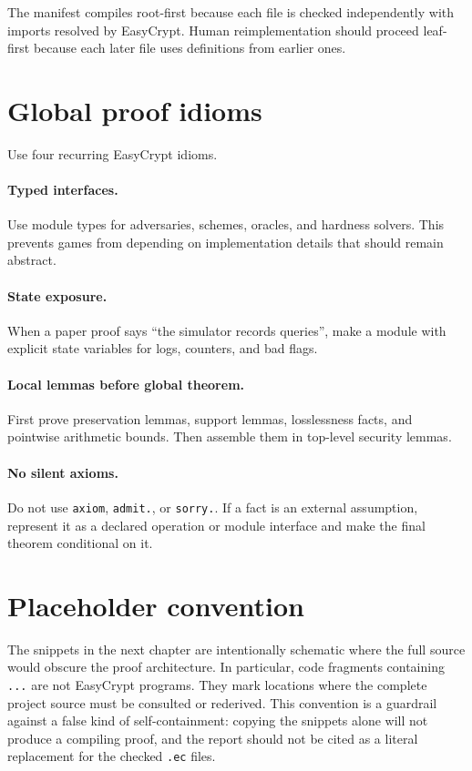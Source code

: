 \documentclass[11pt]{report}
\DeclareRobustCommand{\file}[1]{\ifmmode\text{\nolinkurl{#1}}\else\nolinkurl{#1}\fi}
\DeclareRobustCommand{\ec}[1]{\ifmmode\text{\nolinkurl{#1}}\else\nolinkurl{#1}\fi}
\theoremstyle{definition}
\theoremstyle{plain}
\begin{document}
The manifest compiles root-first because each file is checked independently
with imports resolved by EasyCrypt.  Human reimplementation should proceed
leaf-first because each later file uses definitions from earlier ones.

\section{Global proof idioms}

Use four recurring EasyCrypt idioms.

\paragraph{Typed interfaces.}
Use module types for adversaries, schemes, oracles, and hardness solvers.  This
prevents games from depending on implementation details that should remain
abstract.

\paragraph{State exposure.}
When a paper proof says ``the simulator records queries'', make a module with
explicit state variables for logs, counters, and bad flags.

\paragraph{Local lemmas before global theorem.}
First prove preservation lemmas, support lemmas, losslessness facts, and
pointwise arithmetic bounds.  Then assemble them in top-level security lemmas.

\paragraph{No silent axioms.}
Do not use \ec{axiom}, \ec{admit.}, or \ec{sorry.}.  If a fact is an external
assumption, represent it as a declared operation or module interface and make
the final theorem conditional on it.

\section{Placeholder convention}

The snippets in the next chapter are intentionally schematic where the full
source would obscure the proof architecture.  In particular, code fragments
containing \ec{...} are not EasyCrypt programs.  They mark locations where the
complete project source must be consulted or rederived.  This convention is a
guardrail against a false kind of self-containment: copying the snippets alone
will not produce a compiling proof, and the report should not be cited as a
literal replacement for the checked \file{.ec} files.
\end{document}
